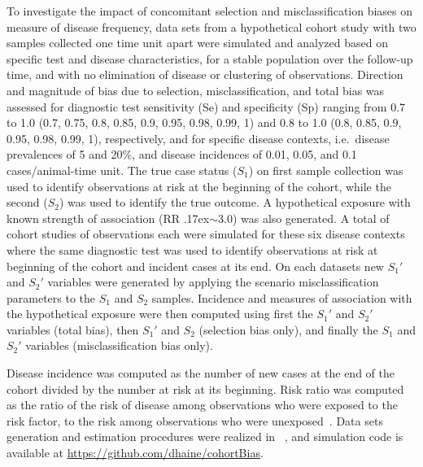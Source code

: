 To investigate the impact of concomitant selection and misclassification biases
on measure of disease frequency, data sets from a hypothetical cohort study with
two samples collected one time unit apart were simulated and analyzed based on
specific test and disease characteristics, for a stable population over the
follow-up time, and with no elimination of disease or clustering of
observations.
Direction and magnitude of bias due to selection, misclassification, and total
bias was assessed for diagnostic test sensitivity (Se) and specificity (Sp)
ranging from 0.7 to 1.0 (0.7, 0.75, 0.8, 0.85, 0.9, 0.95, 0.98, 0.99, 1) and 0.8
to 1.0 (0.8, 0.85, 0.9, 0.95, 0.98, 0.99, 1), respectively, and for specific
disease contexts, i.e.\ disease prevalences of 5 and 20\%, and disease
incidences of 0.01, 0.05, and 0.1 cases/animal-time unit.
The true case status (\(S_1\)) on first sample collection was used to identify
observations at risk at the beginning of the cohort, while the second (\(S_2\))
was used to identify the true outcome.
A hypothetical exposure with known strength of association (RR
\raise.17ex\hbox{$\scriptstyle\sim$}\num{3.0}) was also generated.
A total of  cohort studies of  observations each
were simulated for these six disease contexts where the same diagnostic test was
used to identify observations at risk at beginning of the cohort and incident
cases at its end.
On each datasets new \(S_{1}'\) and \(S_{2}'\) variables were generated by
applying the scenario misclassification parameters to the \(S_1\) and \(S_2\)
samples.
Incidence and measures of association with the hypothetical exposure were then
computed using first the \(S_{1}'\) and \(S_{2}'\) variables (total bias), then
\(S_{1}'\) and \(S_2\) (selection bias only), and finally the \(S_1\) and
\(S_{2}'\) variables (misclassification bias only).

Disease incidence was computed as the number of new cases at the end of the
cohort divided by the number at risk at its beginning.
Risk ratio was computed as the  ratio of the risk of disease among observations
who were exposed to the risk factor, to the risk among observations who were
unexposed~\citep{Rothman2012}.
Data sets generation and estimation procedures were realized in
\R~\citep{Rsystem}, and simulation code is available at
\url{https://github.com/dhaine/cohortBias}.

